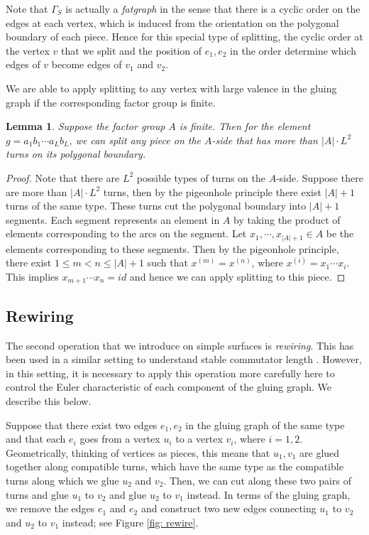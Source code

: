 \documentclass{amsart}
\newtheorem{lemma}[theorem]{Lemma}
\theoremstyle{definition}
\numberwithin{equation}{section}
\theoremstyle{theorem}
\theoremstyle{remark}
\begin{document}
	Note that $\Gamma_S$ is actually a \emph{fatgraph} in the sense that there is a cyclic order on the edges at each vertex, which is induced from the orientation on the polygonal boundary of each piece. Hence for this special type of splitting, the cyclic order at the vertex $v$ that we split and the position of $e_1,e_2$ in the order determine which edges of $v$ become edges of $v_1$ and $v_2$.
	
	We are able to apply splitting to any vertex with large valence in the gluing graph if the corresponding factor group is finite. 
	\begin{lemma}\label{lemma: splitting applicable}
		Suppose the factor group $A$ is finite. Then for the element $g=a_1b_1\cdots a_L b_L$, we can split any piece on the $A$-side that has more than $|A|\cdot L^2$ turns on its polygonal boundary.
	\end{lemma}
	\begin{proof}
		Note that there are $L^2$ possible types of turns on the $A$-side.
		Suppose there are more than $|A|\cdot L^2$ turns, then by the pigeonhole principle there exist $|A|+1$ turns of the same type. These turns cut the polygonal boundary into $|A|+1$ segments.
		Each segment represents an element in $A$ by taking the product of elements corresponding to the arcs on the segment. Let $x_1,\cdots,x_{|A|+1}\in A$ be the elements corresponding to these segments. Then by the pigeonhole principle, there exist $1\le m<n\le |A|+1$ such that $x^{(m)}=x^{(n)}$, where $x^{(i)}=x_1\cdots x_i$. This implies $x_{m+1}\cdots x_n=id$ and hence we can apply splitting to this piece.
	\end{proof}
	
	\subsection{Rewiring}\label{subsec: rewiring}
	The second operation that we introduce on simple surfaces is \emph{rewiring}. This has been used in a similar setting to understand stable commutator length \cite{Chen:sclBS}. However, in this setting, it is necessary to apply this operation more carefully here to control the Euler characteristic of each component of the gluing graph. We describe this below. 
	
	Suppose that there exist two edges $e_1,e_2$ in the gluing graph of the same type and that each $e_i$ goes from a vertex $u_i$ to a vertex $v_i$, where $i=1,2$. Geometrically, thinking of vertices as pieces, this means that $u_1,v_1$ are glued together along compatible turns, which have the same type as the compatible turns along which we glue $u_2$ and $v_2$.
	Then, we can cut along these two pairs of turns and glue $u_1$ to $v_2$ and glue $u_2$ to $v_1$ instead.
	In terms of the gluing graph, we remove the edges $e_1$ and $e_2$ and construct two new edges connecting $u_1$ to $v_2$ and $u_2$ to $v_1$ instead; see Figure \ref{fig: rewire}.
	
\end{document}
